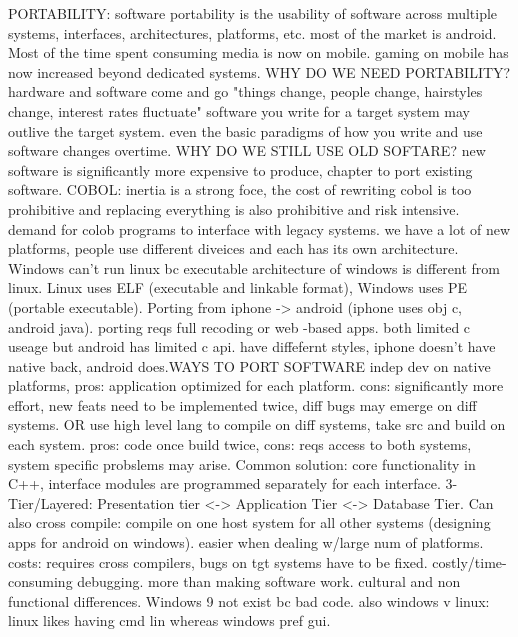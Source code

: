 \documentclass[10pt]{article}
\begin{document}
\begin{landscape}
\begin{multicols*}{6}
PORTABILITY:
software portability is the usability of software across multiple systems, interfaces, architectures, platforms, etc. most of the market is android. Most of the time spent consuming media is now on mobile. gaming on mobile has now increased beyond dedicated systems. WHY DO WE NEED PORTABILITY? hardware and software come and go "things change, people change, hairstyles change, interest rates fluctuate" software you write for a target system may outlive the target system. even the basic paradigms of how you write and use software changes overtime. WHY DO WE STILL USE OLD SOFTARE? new software is significantly more expensive to produce, chapter to port existing software. COBOL: inertia is a strong foce, the cost of rewriting cobol is too prohibitive and replacing everything is also prohibitive and risk intensive. demand for colob programs to interface with legacy systems. we have a lot of new platforms, people use different diveices and each has its own architecture. Windows can't run linux bc executable architecture of windows is different from linux. Linux uses ELF (executable and linkable format), Windows uses PE (portable executable). Porting from iphone -> android (iphone uses obj c, android java). porting reqs full recoding or web -based apps. both limited c useage but android has limited c api. have diffefernt styles, iphone doesn't have native back, android does.WAYS TO PORT SOFTWARE indep dev on native platforms, pros: application optimized for each platform. cons: significantly more effort, new feats need to be implemented twice, diff bugs may emerge on diff systems. OR use high level lang to compile on diff systems, take src and build on each system. pros: code once build twice, cons: reqs access to both systems, system specific probslems may arise. Common solution: core functionality in C++, interface modules are programmed separately for each interface. 3-Tier/Layered: Presentation tier <-> Application Tier <-> Database Tier. Can also cross compile: compile on one host system for all other systems (designing apps for android on windows). easier when dealing w/large num of platforms. costs: requires cross compilers, bugs on tgt systems have to be fixed. costly/time-consuming debugging. more than making software work. cultural and non functional differences. Windows 9 not exist bc bad code. also windows v linux: linux likes having cmd lin whereas windows pref gui.


\end{multicols*}
\end{landscape}
\end{document}
